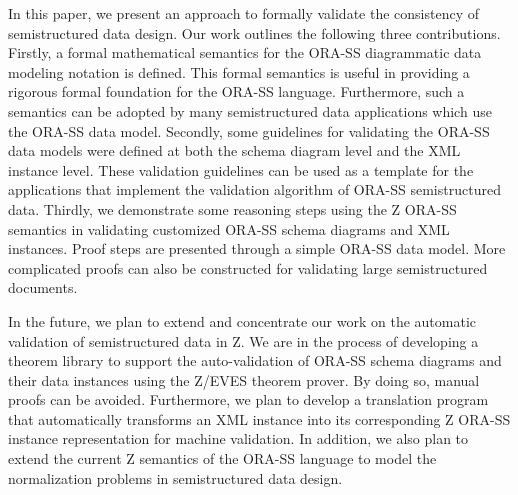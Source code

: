 \documentclass{entcs}
\begin{document}
In this paper, we present an approach to formally validate the
consistency of semistructured data design. Our work outlines the
following three contributions. Firstly, a formal mathematical
semantics for the ORA-SS diagrammatic data modeling notation is
defined. This formal semantics is useful in providing a rigorous
formal foundation for the ORA-SS language. Furthermore, such a
semantics can be adopted by many semistructured data applications
which use the ORA-SS data model. Secondly, some guidelines for
validating the ORA-SS data models were defined at both the schema
diagram level and the XML instance level. These validation
guidelines can be used as a template for the applications that
implement the validation algorithm of ORA-SS semistructured data.
Thirdly, we demonstrate some reasoning steps using the Z ORA-SS
semantics in validating customized ORA-SS schema diagrams and XML
instances. Proof steps are presented through a simple ORA-SS data
model. More complicated proofs can also be constructed for
validating large semistructured documents.

In the future, we plan to extend and concentrate our work on the
automatic validation of semistructured data in Z. We are in the
process of developing a theorem library to support the
auto-validation of ORA-SS schema diagrams and their data instances
using the Z/EVES theorem prover. By doing so, manual proofs can be
avoided. Furthermore, we plan to develop a translation program
that automatically transforms an XML instance into its
corresponding Z ORA-SS instance representation for machine
validation. In addition, we also plan to extend the current Z
semantics of the ORA-SS language to model the normalization
problems in semistructured data design.

%
%
%
\end{document}
